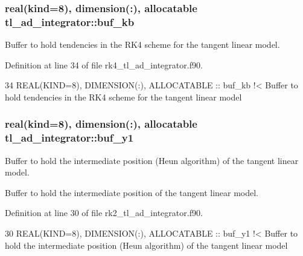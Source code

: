 \subsubsection[{\texorpdfstring{buf\+\_\+kb}{buf_kb}}]{\setlength{\rightskip}{0pt plus 5cm}real(kind=8), dimension(\+:), allocatable tl\+\_\+ad\+\_\+integrator\+::buf\+\_\+kb\hspace{0.3cm}{\ttfamily [private]}}\hypertarget{namespacetl__ad__integrator_abd6a1c209bc0120ea4e1e473e067a902}{}\label{namespacetl__ad__integrator_abd6a1c209bc0120ea4e1e473e067a902}


Buffer to hold tendencies in the R\+K4 scheme for the tangent linear model. 



Definition at line 34 of file rk4\+\_\+tl\+\_\+ad\+\_\+integrator.\+f90.


\begin{DoxyCode}
34   \textcolor{keywordtype}{REAL(KIND=8)}, \textcolor{keywordtype}{DIMENSION(:)}, \textcolor{keywordtype}{ALLOCATABLE} :: buf\_kb\textcolor{comment}{ !< Buffer to hold tendencies in the RK4 scheme for the
       tangent linear model}
\end{DoxyCode}
\subsubsection[{\texorpdfstring{buf\+\_\+y1}{buf_y1}}]{\setlength{\rightskip}{0pt plus 5cm}real(kind=8), dimension(\+:), allocatable tl\+\_\+ad\+\_\+integrator\+::buf\+\_\+y1\hspace{0.3cm}{\ttfamily [private]}}\hypertarget{namespacetl__ad__integrator_a54c26282330477995b554805fbacf236}{}\label{namespacetl__ad__integrator_a54c26282330477995b554805fbacf236}


Buffer to hold the intermediate position (Heun algorithm) of the tangent linear model. 

Buffer to hold the intermediate position of the tangent linear model. 

Definition at line 30 of file rk2\+\_\+tl\+\_\+ad\+\_\+integrator.\+f90.


\begin{DoxyCode}
30   \textcolor{keywordtype}{REAL(KIND=8)}, \textcolor{keywordtype}{DIMENSION(:)}, \textcolor{keywordtype}{ALLOCATABLE} :: buf\_y1\textcolor{comment}{ !< Buffer to hold the intermediate position (Heun
       algorithm) of the tangent linear model}
\end{DoxyCode}
